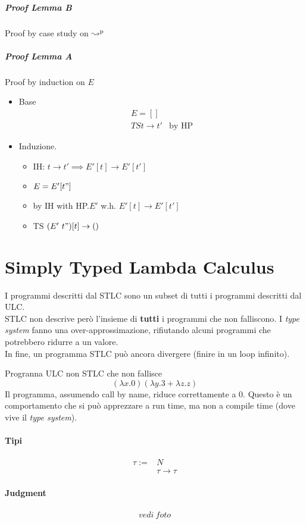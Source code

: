 \documentclass{article}
\begin{document}
\subparagraph{Proof Lemma B} Proof by case study on $\operatorname{ \leadsto^{p} }$
\subparagraph{Proof Lemma A} Proof by induction on $E$
\begin{itemize}
    \item Base
        \begin{align*}
            E = [] \\
            TS t\to t' & \text{by HP} 
        \end{align*}
    \item Induzione. 
        \begin{itemize}
            \item IH: $t\to t' \implies E'[t]\to E'[t']$
            \item $E = E'[t"]$
            \item by IH with HP.$E'$ w.h. $E'[t]\to E'[t']$
            \item TS $(E'\ t")[t] \to ()$
        \end{itemize}
\end{itemize}

\section{Simply Typed Lambda Calculus}
I programmi descritti dal STLC sono un subset di tutti i programmi descritti dal ULC. \\
STLC non descrive però l'insieme di \textbf{tutti} i programmi che non falliscono. I \textit{type system} fanno una over-approssimazione, rifiutando alcuni programmi che potrebbero ridurre a un valore. \\
In fine, un programma STLC può ancora divergere (finire in un loop infinito).
\begin{esempio}{Progranna ULC non STLC che non fallisce}
    $$(\lambda x.0)(\lambda y.3+\lambda z.z)$$
    Il programma, assumendo call by name, riduce correttamente a $0$. Questo è un comportamento che si può apprezzare a run time, ma non a compile time (dove vive il \textit{type system}).
\end{esempio}

\paragraph{Tipi}
\begin{align*}
    \tau :=&N \\
           &\tau\to\tau
\end{align*}

\paragraph{Judgment}
\begin{align*}
    vedi\ foto
\end{align*}
\end{document}
